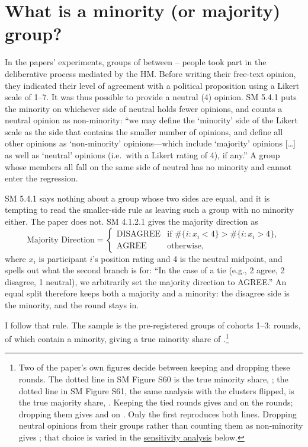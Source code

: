 \documentclass[11pt,a4paper]{article}
\begin{document}
\section*{What is a minority (or majority) group?}

In the papers' experiments, groups of between \groupMin--\groupMax{} people took part in
the deliberative process mediated by the HM. Before writing their free-text opinion, they indicated
their level of agreement with a political proposition using a Likert scale of 1--7. It was thus
possible to provide a neutral (4) opinion. SM 5.4.1 puts the minority on whichever side of neutral
holds fewer opinions, and counts a neutral opinion as non-minority: ``we may define the `minority'
side of the Likert scale as the side that contains the smaller number of opinions, and define all
other opinions as `non-minority' opinions---which include `majority' opinions [\ldots] as well as
`neutral' opinions (i.e.\ with a Likert rating of 4), if any.'' A group whose members all fall on
the same side of neutral has no minority and cannot enter the regression.

SM 5.4.1 says nothing about a group whose two sides are equal, and it is tempting to read the
smaller-side rule as leaving such a group with no minority either. The paper does not. SM 4.1.2.1
gives the majority direction as
%
\[
  \text{Majority Direction} =
  \begin{cases}
    \text{DISAGREE} & \text{if } \#\{i : x_i < 4\} > \#\{i : x_i > 4\},\\
    \text{AGREE}    & \text{otherwise,}
  \end{cases}
\]
%
where $x_i$ is participant $i$'s position rating and 4 is the neutral midpoint, and spells out what
the second branch is for: ``In the case of a tie (e.g., 2 agree, 2 disagree, 1 neutral), we
arbitrarily set the majority direction to AGREE.'' An equal split therefore keeps both a majority
and a minority: the disagree side is the minority, and the round stays in.

I follow that rule. The sample is the pre-registered groups of cohorts 1--3: \groupNRounds{} rounds,
of which \nRoundsTieKept{} contain a minority, giving a true minority share of
\shareTieKept{}.\footnote{Two of the paper's own figures decide between keeping and dropping these
rounds. The dotted line in SM Figure S60 is the true minority share, \paperShare{}; the dotted line
in SM Figure S61, the same analysis with the clusters flipped, is the true majority share,
\paperMajShare{}. Keeping the tied rounds gives \shareTieKept{} and \majShareTieKept{} on the
\nRoundsTieKept{} rounds; dropping them gives \shareTieDropped{} and \majShareTieDropped{} on
\nRoundsTieDropped{}. Only the first reproduces both lines. Dropping neutral opinions from their
groups rather than counting them as non-minority gives \shareRuleNeutralDropped{}; that choice is
varied in the \hyperref[sec:sensitivity]{sensitivity analysis} below.}
\end{document}
